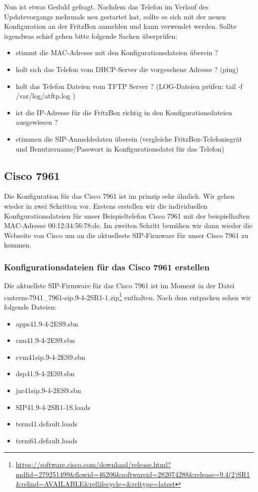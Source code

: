 \documentclass[a4paper,12pt]{scrbook}
\begin{document}
Nun ist etwas Geduld gefragt. Nachdem das Telefon im Verlauf des Updatevorgangs mehrmals neu gestartet hat, sollte es sich mit der neuen Konfiguration an der FritzBox anmelden und kann 
verwendet werden. Sollte irgendwas schief gehen bitte folgende Sachen überprüfen:

\begin{itemize}
 \item stimmt die MAC-Adresse mit den Konfigurationsdateien überein ?
 \item holt sich das Telefon vom DHCP-Server die vorgesehene Adresse ? (ping)
 \item holt das Telefon Dateien vom TFTP Server ? (LOG-Dateien prüfen: tail -f /var/log/atftp.log )
 \item ist die IP-Adresse für die FritzBox richtig in den Konfigurationsdateien ausgewiesen ?
 \item stimmen die SIP-Anmeldedaten überein (vergleiche FritzBox-Telefoniegrät und Benutzername/Passwort in Konfigurationsdatei für das Telefon) 
\end{itemize}


\subsection{Cisco 7961}
Die Konfiguration für das Cisco 7961 ist im prinzip sehr ähnlich. Wir gehen wieder in zwei Schritten vor. Erstens erstellen wir die individuellen Konfigurationsdateien für unser 
Beispieltelefon Cisco 7961 mit der beispielhaften MAC-Adresse 00:12:34:56:78:de. Im zweiten Schritt bemühen wir dann wieder die Webseite von Cisco um an die aktuelleste SIP-Firmware für unser
Cisco 7961 zu kommen.

\subsubsection{Konfigurationsdateien für das Cisco 7961 erstellen}
Die aktuellste SIP-Firmware für das Cisco 7961 ist im Moment in der Datei cmterm-7941\_7961-sip.9-4-2SR1-1.zip\footnote{\url{https://software.cisco.com/download/release.html?mdfid=279251499\&flowid=46206\&softwareid=282074288\&release=9.4(2)SR1\&relind=AVAILABLE\&rellifecycle=\&reltype=latest}} enthalten. Nach dem entpacken sehen wir folgende Dateien:

\begin{itemize}
 \item apps41.9-4-2ES9.sbn  
 \item cnu41.9-4-2ES9.sbn
 \item cvm41sip.9-4-2ES9.sbn
 \item dsp41.9-4-2ES9.sbn
 \item jar41sip.9-4-2ES9.sbn
 \item SIP41.9-4-2SR1-1S.loads
 \item term41.default.loads
 \item term61.default.loads
\end{itemize}
\end{document}
